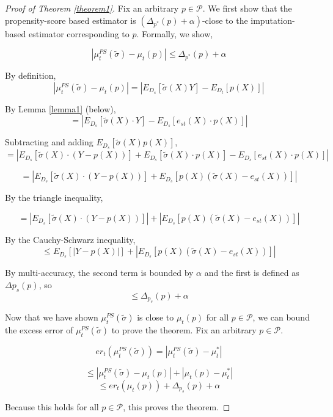 \documentclass{article} %
\begin{document}
\begin{proof}[Proof of Theorem \ref{theorem1}]
    Fix an arbitrary $p \in \mathcal{P}$. We first show that the propensity-score based estimator is $(\Delta_{p^*}(p) + \alpha)$-close to the imputation-based estimator corresponding to $p$. Formally, we show,

    \begin{equation*}
        |\mu_t^{PS}(\tilde{\sigma}) - \mu_t(p)| \le \Delta_{p^*}(p) + \alpha
    \end{equation*}
    
    By definition,
    \begin{equation*}
        |\mu_t^{PS}(\tilde{\sigma}) - \mu_t(p)| = |E_{D_s}[\tilde{\sigma}(X)Y] - E_{D_t}[p(X)]|
    \end{equation*}   
    
    
    By Lemma \ref{lemma1} (below), 
    $$= |E_{D_s}[\tilde{\sigma}(X)\cdot Y] - E_{D_s}[e_{st}(X)\cdot p(X)]|$$
    

    Subtracting and adding $E_{D_s}[\tilde{\sigma}(X) p(X)]$,
    $$= |E_{D_s}[\tilde{\sigma}(X)\cdot (Y - p(X))] + E_{D_s}[\tilde{\sigma}(X)\cdot p(X)]-E_{D_s}[e_{st}(X)\cdot p(X)]|$$

    $$= |E_{D_s}[\tilde{\sigma}(X)\cdot (Y - p(X))] + E_{D_s}[p(X)\left(\tilde{\sigma}(X)-e_{st}(X)\right)]|$$
    
    By the triangle inequality,
    
    $$= |E_{D_s}[\tilde{\sigma}(X)\cdot (Y - p(X))]| + |E_{D_s}[p(X)\left(\tilde{\sigma}(X)-e_{st}(X)\right)]|$$

    By the Cauchy-Schwarz inequality,
    $$\le E_{D_s}[|Y - p(X)|] + |E_{D_s}[p(X)\left(\tilde{\sigma}(X)-e_{st}(X)\right)]|$$

    By multi-accuracy, the second term is bounded by $\alpha$ and the first is defined as $\Delta{p_s}(p)$, so
    $$\le \Delta_{p_s}(p) + \alpha$$
    
    Now that we have shown $\mu_t^{PS}(\tilde{\sigma})$ is close to $\mu_t(p)$ for all $p \in \mathcal{P}$, we can bound the excess error of $\mu_t^{PS}(\tilde{\sigma})$ to prove the theorem. Fix an arbitrary $p \in \mathcal{P}$.
    
    $$er_{t}(\mu_t^{PS}(\tilde{\sigma})) = |\mu_t^{PS}(\tilde{\sigma}) - \mu_t^*|$$
    
    $$\le |\mu_t^{PS}(\tilde{\sigma}) - \mu_t(p)| + |\mu_t(p) - \mu_t^*|$$
    $$\le  er_t(\mu_t(p)) + \Delta_{p_s}(p) + \alpha$$

Because this holds for all $p \in \mathcal{P}$, this proves the theorem. 
\end{proof}
\end{document}
